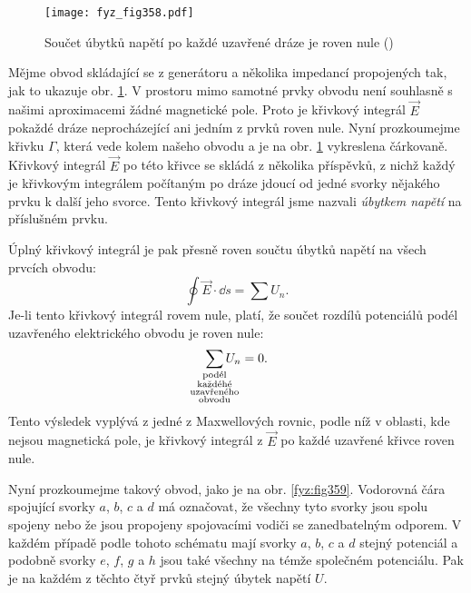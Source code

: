 {  \begin{figure}[ht!] %
    \centering
    \texttt{[image: fyz\_fig358.pdf]}
    \caption{Součet úbytků napětí po každé uzavřené dráze je roven nule
             (\cite[s.~399]{Feynman02})}
    \label{fyz:fig358}
  \end{figure}
  
  Mějme obvod skládající se z generátoru a několika impedancí propojených tak, jak to ukazuje obr. 
  \ref{fyz:fig358}. V prostoru mimo samotné prvky obvodu není souhlasně s našimi aproximacemi žádné 
  magnetické pole. Proto je křivkový integrál \(\vec{E}\) pokaždé dráze neprocházející ani jedním z 
  prvků roven nule. Nyní prozkoumejme křivku \(\Gamma\), která vede kolem našeho obvodu a je na 
  obr. \ref{fyz:fig358} vykreslena čárkovaně. Křivkový integrál \(\vec{E}\) po této křivce se 
  skládá z několika příspěvků, z nichž každý je křivkovým integrálem počítaným po dráze jdoucí od 
  jedné svorky nějakého prvku k další jeho svorce. Tento křivkový integrál jsme nazvali 
  \emph{úbytkem napětí} na příslušném prvku.
  
  Úplný křivkový integrál je pak přesně roven součtu úbytků napětí na všech prvcích obvodu: 
  \begin{equation}\label{fyz:eq482}
    \oint\vec{E}\cdot\dd{s} = \sum U_n.
  \end{equation}
  Je-li tento křivkový integrál rovem nule, platí, že součet rozdílů potenciálů podél uzavřeného 
  elektrického obvodu je roven nule:
  \begin{equation}\label{fyz:eq483}
    \sum_{\mathclap{\substack{\text{podél}\\\text{každéhé}\\\text{uzavřeného}\\\text{obvodu}}}} 
         U_n = 0.
  \end{equation}
  Tento výsledek vyplývá z jedné z Maxwellových rovnic, podle níž v oblasti, kde nejsou magnetická 
  pole, je křivkový integrál z \(\vec{E}\) po každé uzavřené křivce roven nule. 
  
  Nyní prozkoumejme takový obvod, jako je na obr. \ref{fyz:fig359}. Vodorovná čára spojující svorky 
  \(a\), \(b\), \(c\) a \(d\) má označovat, že všechny tyto svorky jsou spolu spojeny nebo že jsou 
  propojeny spojovacími vodiči se zanedbatelným odporem. V každém případě podle tohoto schématu 
  mají svorky \(a\), \(b\), \(c\) a \(d\) stejný potenciál a podobně svorky \(e\), \(f\), \(g\) a 
  \(h\) jsou také všechny na témže společném potenciálu. Pak je na každém z těchto čtyř prvků 
  stejný úbytek napětí \(U\).

}
